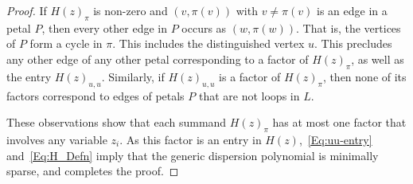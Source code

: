 \documentclass[12pt]{amsart}
\theoremstyle{remark}
\begin{document}
\begin{proof}
  If  $H(z)_\pi$ is non-zero and $(v,\pi(v))$ with $v\neq \pi(v)$ is an edge in a petal $P$, then every other edge in
  $P$ occurs as $(w,\pi(w))$.
  That is, the vertices of $P$ form a cycle in $\pi$.
  This includes the distinguished vertex $u$.
  This precludes any other edge of any other petal corresponding to a factor of $H(z)_\pi$, as well as the entry $H(z)_{u,u}$.
  Similarly, if $H(z)_{u,u}$ is a factor of $H(z)_\pi$, then none of its factors correspond to edges of
  petals $P$ that are not loops in $L$. 

  These observations show that  each summand $H(z)_\pi$ has at most one factor that
  involves any variable $z_i$.
  As this factor is an entry in $H(z)$,~\eqref{Eq:uu-entry} and~\eqref{Eq:H_Defn} imply that the generic dispersion polynomial
  is minimally sparse, and completes the proof.
\end{proof}
\end{document}
